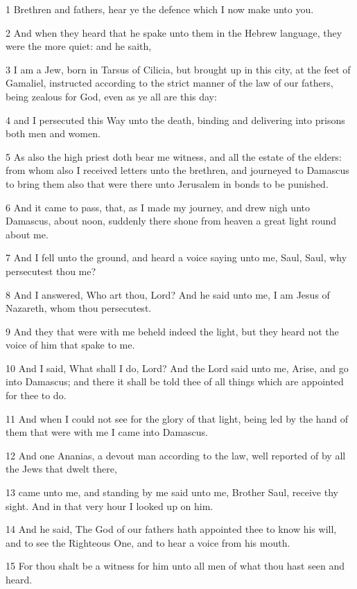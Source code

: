 \par 1 Brethren and fathers, hear ye the defence which I now make unto you.
\par 2 And when they heard that he spake unto them in the Hebrew language, they were the more quiet: and he saith,
\par 3 I am a Jew, born in Tarsus of Cilicia, but brought up in this city, at the feet of Gamaliel, instructed according to the strict manner of the law of our fathers, being zealous for God, even as ye all are this day:
\par 4 and I persecuted this Way unto the death, binding and delivering into prisons both men and women.
\par 5 As also the high priest doth bear me witness, and all the estate of the elders: from whom also I received letters unto the brethren, and journeyed to Damascus to bring them also that were there unto Jerusalem in bonds to be punished.
\par 6 And it came to pass, that, as I made my journey, and drew nigh unto Damascus, about noon, suddenly there shone from heaven a great light round about me.
\par 7 And I fell unto the ground, and heard a voice saying unto me, Saul, Saul, why persecutest thou me?
\par 8 And I answered, Who art thou, Lord? And he said unto me, I am Jesus of Nazareth, whom thou persecutest.
\par 9 And they that were with me beheld indeed the light, but they heard not the voice of him that spake to me.
\par 10 And I said, What shall I do, Lord? And the Lord said unto me, Arise, and go into Damascus; and there it shall be told thee of all things which are appointed for thee to do.
\par 11 And when I could not see for the glory of that light, being led by the hand of them that were with me I came into Damascus.
\par 12 And one Ananias, a devout man according to the law, well reported of by all the Jews that dwelt there,
\par 13 came unto me, and standing by me said unto me, Brother Saul, receive thy sight. And in that very hour I looked up on him.
\par 14 And he said, The God of our fathers hath appointed thee to know his will, and to see the Righteous One, and to hear a voice from his mouth.
\par 15 For thou shalt be a witness for him unto all men of what thou hast seen and heard.

